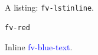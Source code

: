 \documentclass{article}
\begin{document}

A listing: \lstinline|fv-lstinline|.
\begin{Verbatim}[formatcom=\color{red}]
fv-red
\end{Verbatim}
Inline \textcolor{blue}{fv-blue-text}.
\end{document}
